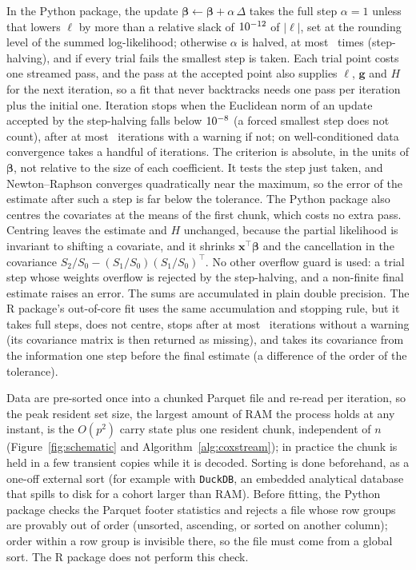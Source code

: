\documentclass[11pt,a4paper]{article}
\begin{document}
In the Python package, the update $\boldsymbol\beta \leftarrow
\boldsymbol\beta + \alpha\,\Delta$ takes the full step $\alpha = 1$ unless that
lowers $\ell$ by more than a relative slack of $10^{-12}$ of $|\ell|$,
set at the rounding level of the summed log-likelihood; otherwise $\alpha$ is
halved, at most \CoxStreamMaxHalvings\ times (step-halving), and if every trial
fails the smallest step is taken. Each trial point costs one streamed pass, and
the pass at the accepted point also supplies $\ell$, $\mathbf{g}$ and $H$ for
the next iteration, so a fit that never backtracks needs one pass per
iteration plus the initial one. Iteration stops when the Euclidean norm of an
update accepted by the step-halving falls below $10^{-8}$ (a forced
smallest step does not count), after at most \CoxStreamMaxIter\
iterations with a warning if not; on well-conditioned data convergence takes a
handful of iterations. The criterion is absolute, in the units of
$\boldsymbol\beta$, not relative to the size of each coefficient. It tests the
step just taken, and Newton--Raphson converges quadratically near the maximum,
so the error of the estimate after such a step is far below the tolerance. The
Python package also centres the covariates at the means of the first chunk,
which costs no extra pass. Centring leaves the
estimate and $H$ unchanged, because the partial likelihood is invariant to
shifting a covariate, and it shrinks $\mathbf{x}^\top\boldsymbol\beta$ and the
cancellation in the covariance $S_2/S_0 - (S_1/S_0)(S_1/S_0)^\top$. No other
overflow guard is used: a trial step whose weights overflow is rejected by the
step-halving, and a non-finite final estimate raises an error. The sums are
accumulated in plain double precision. The R package's out-of-core fit uses
the same accumulation and stopping rule, but it takes full steps, does not
centre, stops after at most \CoxStreamRMaxIter\ iterations without a warning
(its covariance matrix is then returned as missing), and takes its covariance
from the information one step before the final estimate (a difference of the
order of the tolerance).

Data are pre-sorted once into a chunked Parquet file and re-read per
iteration, so the peak resident set size, the largest amount of RAM the process
holds at any instant, is the $O(p^2)$ carry state plus one resident chunk,
independent of $n$ (Figure~\ref{fig:schematic} and
Algorithm~\ref{alg:coxstream}); in practice the chunk is held in a few
transient copies while it is decoded. Sorting is done beforehand, as a one-off
external sort (for example with \texttt{DuckDB}, an embedded analytical
database that spills to disk for a cohort larger than RAM). Before fitting, the Python package checks
the Parquet footer statistics and rejects a file whose row groups are provably
out of order (unsorted, ascending, or sorted on another column); order within a
row group is invisible there, so the file must come from a global sort. The R
package does not perform this check.
\end{document}
